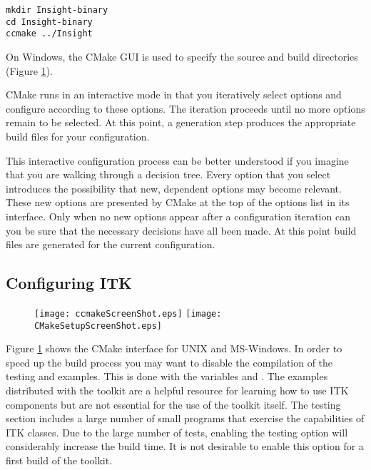 \small
\begin{verbatim}
mkdir Insight-binary
cd Insight-binary
ccmake ../Insight
\end{verbatim}
\normalsize

On Windows, the CMake GUI is used to specify the source and build
directories (Figure \ref{fig:CMakeGUI}).

CMake runs in an interactive mode in that you iteratively select options and
configure according to these options. The iteration proceeds until no more
options remain to be selected. At this point, a generation step produces the appropriate
build files for your configuration.

This interactive configuration process can be better understood if you
imagine that you are walking through a decision tree.  Every option that you
select introduces the possibility that new, dependent options may become
relevant. These new options are presented by CMake at the top of the options
list in its interface.  Only when no new options appear after a configuration
iteration can you be sure that the necessary decisions have all been made. At
this point build files are generated for the current configuration.

\subsection{Configuring ITK}
\label{sec:ConfiguringITKwithVTK}
  

\begin{figure}[ht]
\centering 
\texttt{[image: ccmakeScreenShot.eps]}
\texttt{[image: CMakeSetupScreenShot.eps]}
\label{fig:CMakeGUI}
\end{figure}

Figure \ref{fig:CMakeGUI} shows the CMake interface for UNIX and MS-Windows.
In order to speed up the build process you may want to disable the compilation
of the testing and examples. This is done with the variables
 and .  The examples
distributed with the toolkit are a helpful resource for learning how to use ITK
components but are not essential for the use of the toolkit itself. The testing
section includes a large number of small programs that exercise the
capabilities of ITK classes. Due to the large number of tests, enabling the
testing option will considerably increase the build time.  It is not
desirable to enable this option for a first build of the toolkit.

